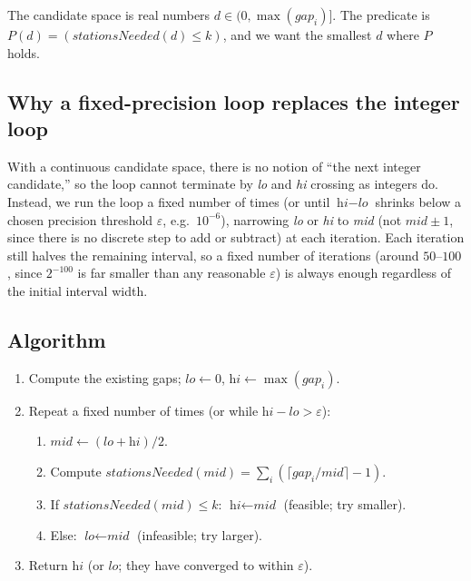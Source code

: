 \begin{ideabox}
The candidate space is real numbers $d \in (0, \max(\textit{gap}_i)]$.
The predicate is $P(d) = (\textit{stationsNeeded}(d) \le k)$, and we want
the smallest $d$ where $P$ holds.
\end{ideabox}

\subsection*{Why a fixed-precision loop replaces the integer loop}

With a continuous candidate space, there is no notion of ``the next
integer candidate,'' so the loop cannot terminate by \textit{lo} and
\textit{hi} crossing as integers do. Instead, we run the loop a fixed
number of times (or until $\textit{hi} - \textit{lo}$ shrinks below a
chosen precision threshold $\varepsilon$, e.g.\ $10^{-6}$), narrowing
\textit{lo} or \textit{hi} to \textit{mid} (not $\textit{mid} \pm 1$, since
there is no discrete step to add or subtract) at each iteration. Each
iteration still halves the remaining interval, so a fixed number of
iterations (around $50$--$100$, since $2^{-100}$ is far smaller than any
reasonable $\varepsilon$) is always enough regardless of the initial
interval width.

\subsection*{Algorithm}

\begin{enumerate}
  \item Compute the existing gaps; $\textit{lo} \gets 0$,
        $\textit{hi} \gets \max(\textit{gap}_i)$.
  \item Repeat a fixed number of times (or while
        $\textit{hi} - \textit{lo} > \varepsilon$):
  \begin{enumerate}
    \item $\textit{mid} \gets (\textit{lo}+\textit{hi})/2$.
    \item Compute $\textit{stationsNeeded}(\textit{mid}) =
          \sum_i \left( \lceil \textit{gap}_i / \textit{mid} \rceil - 1
          \right)$.
    \item If $\textit{stationsNeeded}(\textit{mid}) \le k$:
          $\textit{hi} \gets \textit{mid}$ (feasible; try smaller).
    \item Else: $\textit{lo} \gets \textit{mid}$ (infeasible; try larger).
  \end{enumerate}
  \item Return $\textit{hi}$ (or $\textit{lo}$; they have converged to
        within $\varepsilon$).
\end{enumerate}

